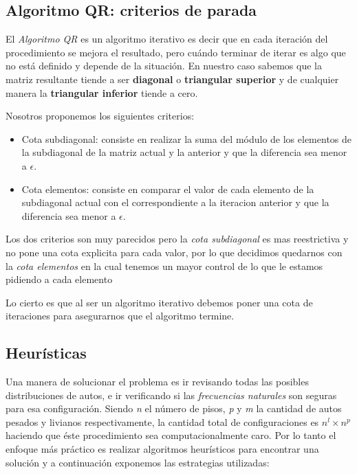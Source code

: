 \documentclass[a4paper]{article}
\begin{document}
\subsection{Algoritmo QR: criterios de parada}

El \textit{Algoritmo QR} es un algoritmo iterativo es decir que en cada iteración del procedimiento se mejora el resultado, pero cuándo terminar de iterar es algo que no está definido y depende de la situación. En nuestro caso sabemos que la matriz resultante tiende a ser \textbf{diagonal} o \textbf{triangular superior} y de cualquier manera la \textbf{triangular inferior} tiende a cero. 

Nosotros proponemos los siguientes criterios: 

\begin{itemize}
\item Cota subdiagonal: consiste en realizar la suma del módulo de los elementos de la subdiagonal de la matriz actual y la anterior y que la diferencia sea menor a $\epsilon$.

\item Cota elementos: consiste en comparar el valor de cada elemento de la subdiagonal actual con el correspondiente a la iteracion anterior y que la diferencia sea menor a $\epsilon$.
\end{itemize}

Los dos criterios son muy parecidos pero la \textit{cota subdiagonal} es mas reestrictiva y no pone una cota explicita para cada valor, por lo que decidimos quedarnos con la \textit{cota elementos} en la cual tenemos un mayor control de lo que le estamos pidiendo a cada elemento

Lo cierto es que al ser un algoritmo iterativo debemos poner una cota de iteraciones para asegurarnos que el algoritmo termine.





\newpage
\subsection{Heurísticas}

Una manera de solucionar el problema es ir revisando todas las posibles distribuciones de autos, e ir verificando si las \textit{frecuencias naturales} son seguras para esa configuración. Siendo \textit{n} el número de pisos, \textit{p} y \textit{m} la cantidad de autos pesados y livianos respectivamente, la cantidad total de configuraciones es $n^l \times n^p$ haciendo que éste procedimiento sea computacionalmente caro. Por lo tanto el enfoque más práctico es realizar algoritmos heurísticos para encontrar una solución y a continuación exponemos las estrategias utilizadas:
\end{document}
